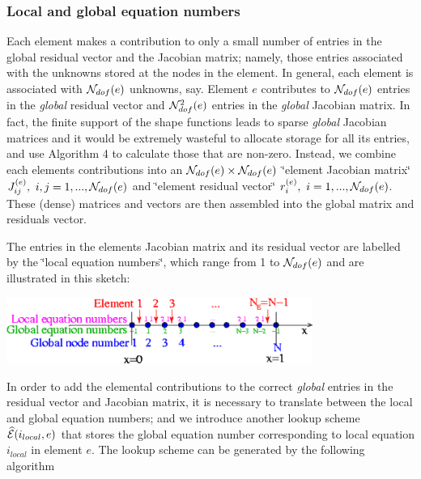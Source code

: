 \hypertarget{index_local_eqn_numbers}{}\subsubsection{Local and global equation numbers}\label{index_local_eqn_numbers}
Each element makes a contribution to only a small number of entries in the global residual vector and the Jacobian matrix; namely, those entries associated with the unknowns stored at the nodes in the element. In general, each element is associated with $ {\cal N}_{dof}(e)$ unknowns, say. Element $e$ contributes to $ {\cal N}_{dof}(e)$ entries in the {\itshape global} residual vector and $ {\cal N}^2_{dof}(e)$ entries in the {\itshape global} Jacobian matrix. In fact, the finite support of the shape functions leads to sparse {\itshape global} Jacobian matrices and it would be extremely wasteful to allocate storage for all its entries, and use Algorithm 4 to calculate those that are non-\/zero. Instead, we combine each element\textquotesingle{}s contributions into an $ {\cal N}_{dof}(e) \times {\cal N}_{dof}(e) $ \char`\"{}element Jacobian matrix\char`\"{} $ J_{ij}^{(e)}, \ i,j=1,...,{\cal N}_{dof}(e) $ and \char`\"{}element residual vector\char`\"{} $ r_{i}^{(e)}, \ i=1,..., {\cal N}_{dof}(e) $. These (dense) matrices and vectors are then assembled into the global matrix and residuals vector.

The entries in the element\textquotesingle{}s Jacobian matrix and its residual vector are labelled by the \char`\"{}local equation numbers\char`\"{}, which range from 1 to $ {\cal N}_{dof}(e)$ and are illustrated in this sketch\+:  
\begin{DoxyImage}
\includegraphics[width=0.75\textwidth]{1Dmesh_local_and_global_node_and_equation_numbers}
\end{DoxyImage}


In order to add the elemental contributions to the correct {\itshape global} entries in the residual vector and Jacobian matrix, it is necessary to translate between the local and global equation numbers; and we introduce another lookup scheme $ \widehat{\cal E}(i_{local},e)$ that stores the global equation number corresponding to local equation $i_{local}$ in element $e$. The lookup scheme can be generated by the following algorithm

